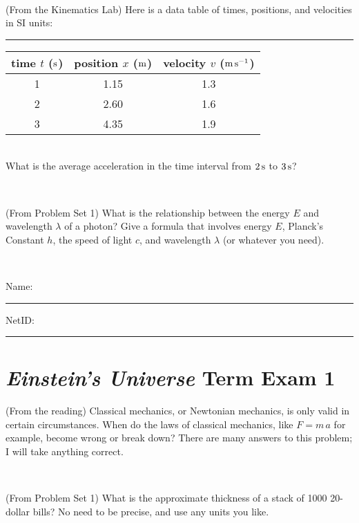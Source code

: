 \documentclass[12pt, letterpaper]{article}
\begin{document}
\vfill ~

\begin{problem} (From the Kinematics Lab)
Here is a data table of times, positions, and velocities in SI units:\\
\rule{1.0in}{0pt}\begin{tabular}{c|c|c}
time $t$ ($\mathrm{s}$) & position $x$ ($\mathrm{m}$) & velocity $v$ ($\mathrm{m}\,\mathrm{s}^{-1}$) \\
\hline
1 & 1.15 & 1.3 \\
2 & 2.60 & 1.6 \\
3 & 4.35 & 1.9 \\
\hline
\end{tabular}\\
What is the average acceleration in the time interval from $2\,\mathrm{s}$ to $3\,\mathrm{s}$?
\end{problem}


\vfill ~

\begin{problem} (From Problem Set 1)
What is the relationship between the energy $E$ and wavelength
$\lambda$ of a photon? Give a formula that involves energy $E$,
Planck's Constant $h$, the speed of light $c$, and wavelength
$\lambda$ (or whatever you need).
\end{problem}

\vfill ~


\cleardoublepage



\noindent
Name: \rule[-1ex]{0.60\textwidth}{0.1pt}
NetID: \rule[-1ex]{0.20\textwidth}{0.1pt}

\section*{\textsl{Einstein's Universe} Term Exam 1}
\setcounter{problem}{1}


\begin{problem} (From the reading)
Classical mechanics, or Newtonian mechanics, is only valid in certain
circumstances. When do the laws of classical mechanics, like $F =
m\,a$ for example, become wrong or break down? There are many answers
to this problem; I will take anything correct.
\end{problem}


\vfill ~

\begin{problem} (From Problem Set 1)
What is the approximate thickness of a stack of 1000 20-dollar bills?
No need to be precise, and use any units you like.
\end{problem}
\end{document}
